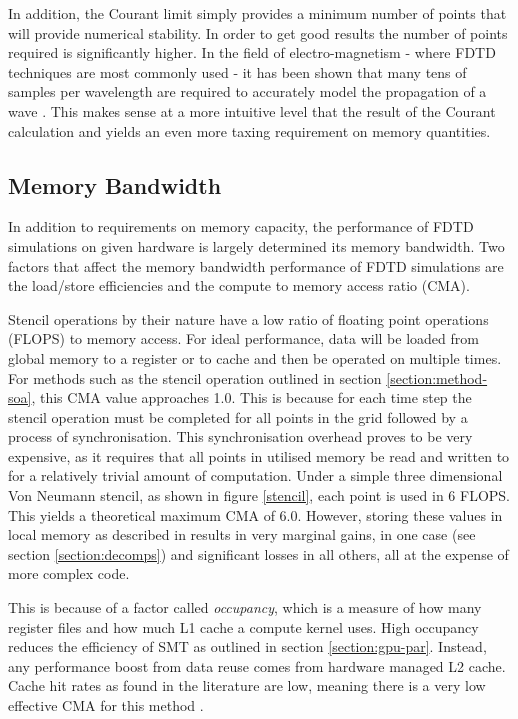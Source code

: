 \documentclass[12pt,a4paper]{report}
\begin{document}
In addition, the Courant limit simply provides a minimum number of points that will provide numerical stability. In order to get good results the number of points required is significantly higher. In the field of electro-magnetism - where FDTD techniques are most commonly used - it has been shown that many tens of samples per wavelength are required to accurately model the propagation of a wave \cite{ref:electro}. This makes sense at a more intuitive level that the result of the Courant calculation and yields an even more taxing requirement on memory quantities.

\subsection{Memory Bandwidth}

In addition to requirements on memory capacity, the performance of FDTD simulations on given hardware is largely determined its memory bandwidth.  Two factors that affect the memory bandwidth performance of FDTD simulations are the load/store efficiencies and the compute to memory access ratio (CMA).

Stencil operations by their nature have a low ratio of floating point operations (FLOPS) to memory access. For ideal performance, data will be loaded from global memory to a register or to cache and then be operated on multiple times. For methods such as the stencil operation outlined in section \ref{section:method-soa}, this CMA value approaches \num{1.0}. This is because for each time step the stencil operation must be completed for all points in the grid followed by a process of synchronisation. This synchronisation overhead proves to be very expensive, as it requires that all points in utilised memory be read and written to for a relatively trivial amount of computation. Under a simple three dimensional Von Neumann stencil, as shown in figure \ref{stencil}, each point is used in 6 FLOPS. This yields a theoretical maximum CMA of \num{6.0}. However, storing these values in local memory as described in \cite{craig} results in very marginal gains, in one case (see section \ref{section:decomps}) and significant losses in all others, all at the expense of more complex code. 

This is because of a factor called \emph{occupancy}, which is a measure of how many register files and how much L1 cache a compute kernel uses. High occupancy reduces the efficiency of SMT as outlined in section \ref{section:gpu-par}. Instead, any performance boost from data reuse comes from hardware managed L2 cache. Cache hit rates as found in the literature are low, meaning there is a very low effective CMA for this method \cite{craig}.
\end{document}

